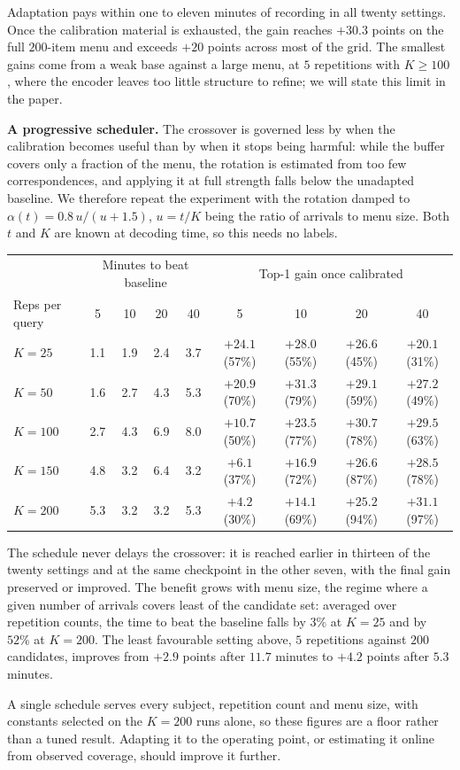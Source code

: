 \documentclass[11pt]{article}
\begin{document}
{Adaptation pays within one to eleven minutes of recording in all twenty settings. Once the calibration material is exhausted, the gain reaches $+30.3$ points on the full $200$-item menu and exceeds $+20$ points across most of the grid. The smallest gains come from a weak base against a large menu, at $5$ repetitions with $K \geq 100$, where the encoder leaves too little structure to refine; we will state this limit in the paper.

\textbf{A progressive scheduler.} The crossover is governed less by when the calibration becomes useful than by when it stops being harmful: while the buffer covers only a fraction of the menu, the rotation is estimated from too few correspondences, and applying it at full strength falls below the unadapted baseline. We therefore repeat the experiment with the rotation damped to $\alpha(t) = 0.8\,u/(u+1.5)$, $u = t/K$ being the ratio of arrivals to menu size. Both $t$ and $K$ are known at decoding time, so this needs no labels.

\begin{center}
\small\setlength{\tabcolsep}{4pt}
\begin{tabular}{lcccc|cccc}
\hline
& \multicolumn{4}{c|}{Minutes to beat baseline} & \multicolumn{4}{c}{Top-1 gain once calibrated} \\
Reps per query & 5 & 10 & 20 & 40 & 5 & 10 & 20 & 40 \\
\hline
$K=25$  & 1.1 & 1.9 & 2.4 & 3.7 & $+24.1$ (57\%) & $+28.0$ (55\%) & $+26.6$ (45\%) & $+20.1$ (31\%) \\
$K=50$  & 1.6 & 2.7 & 4.3 & 5.3 & $+20.9$ (70\%) & $+31.3$ (79\%) & $+29.1$ (59\%) & $+27.2$ (49\%) \\
$K=100$ & 2.7 & 4.3 & 6.9 & 8.0 & $+10.7$ (50\%) & $+23.5$ (77\%) & $+30.7$ (78\%) & $+29.5$ (63\%) \\
$K=150$ & 4.8 & 3.2 & 6.4 & 3.2 & $+6.1$ (37\%)  & $+16.9$ (72\%) & $+26.6$ (87\%) & $+28.5$ (78\%) \\
$K=200$ & 5.3 & 3.2 & 3.2 & 5.3 & $+4.2$ (30\%)  & $+14.1$ (69\%) & $+25.2$ (94\%) & $+31.1$ (97\%) \\
\hline
\end{tabular}
\end{center}

The schedule never delays the crossover: it is reached earlier in thirteen of the twenty settings and at the same checkpoint in the other seven, with the final gain preserved or improved. The benefit grows with menu size, the regime where a given number of arrivals covers least of the candidate set: averaged over repetition counts, the time to beat the baseline falls by $3\%$ at $K=25$ and by $52\%$ at $K=200$. The least favourable setting above, $5$ repetitions against $200$ candidates, improves from $+2.9$ points after $11.7$ minutes to $+4.2$ points after $5.3$ minutes.

A single schedule serves every subject, repetition count and menu size, with constants selected on the $K=200$ runs alone, so these figures are a floor rather than a tuned result. Adapting it to the operating point, or estimating it online from observed coverage, should improve it further.
}
\end{document}
